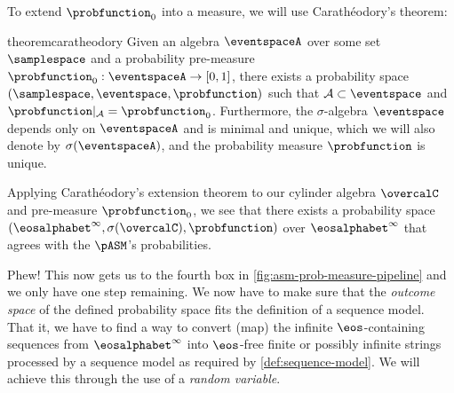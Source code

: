 To extend $\probfunction_0$ into a measure, we will use Carath\'eodory's theorem:
\begin{restatable}{theorem}{caratheodory} \label{thm:caratheodory}
Given an algebra $\eventspaceA$ over some set $\samplespace$ and a probability pre-measure $\probfunction_0:\eventspaceA\to[0,1]$, there exists a probability space $(\samplespace,\eventspace,\probfunction)$ such that $\mathcal{A} \subset \eventspace$ and $\probfunction|_\mathcal{A}=\probfunction_0$. 
Furthermore, the $\sigma$-algebra $\eventspace$
depends only on $\eventspaceA$ and is minimal and unique, which we will also denote by $\sigma(\eventspaceA)$, and the probability measure $\probfunction$ is unique.
\end{restatable}
Applying Carath\'eodory's extension theorem to our cylinder algebra $\overcalC$ and pre-measure $\probfunction_0$, we see that there exists a probability space $(\eosalphabet^\infty,\sigma(\overcalC),\probfunction)$ over $\eosalphabet^\infty$ that agrees with the \autoregmodel $\pASM$'s probabilities.

Phew!
This now gets us to the fourth box in \cref{fig:asm-prob-measure-pipeline} and we only have one step remaining.
We now have to make sure that the \emph{outcome space} of the defined probability space fits the definition of a sequence model.
That it, we have to find a way to convert (map) the infinite $\eos$-containing sequences from $\eosalphabet^\infty$ into $\eos$-free finite or possibly infinite strings processed by a sequence model as required by \cref{def:sequence-model}.
We will achieve this through the use of a \emph{random variable}.

